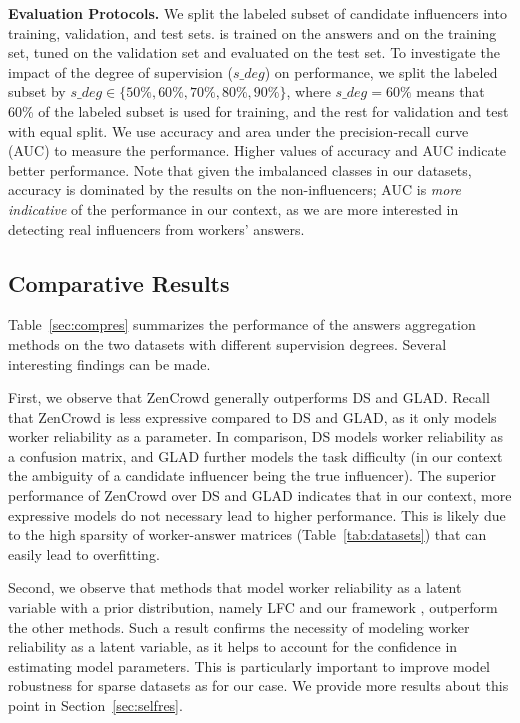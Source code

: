 \smallskip
\noindent\textbf{Evaluation Protocols.} We split the labeled subset of candidate influencers into training, validation, and test sets. \sys is trained on the answers and on the training set, tuned on the validation set and evaluated on the test set. To investigate the impact of the degree of supervision ($s\_deg$) on \sys performance, we split the labeled subset by $s\_deg\in \{50\%, 60\%, 70\%, 80\%, 90\%\}$, where $s\_deg = 60\%$ means that 60\% of the labeled subset is used for training, and the rest for validation and test with equal split. We use accuracy and area under the precision-recall curve (AUC) to measure the performance. Higher values of accuracy and AUC indicate better performance. Note that given the imbalanced classes in our datasets, accuracy is dominated by the results on the non-influencers; AUC is \emph{more indicative} of the performance in our context, as we are more interested in detecting real influencers from workers' answers. 



\subsection{Comparative Results}
Table~\ref{sec:compres} summarizes the performance of the answers aggregation methods on the two datasets with different supervision degrees. Several interesting findings can be made.

First, we observe that ZenCrowd generally outperforms DS and GLAD. Recall that ZenCrowd is less expressive compared to DS and GLAD, as it only models worker reliability as a parameter. In comparison, DS models worker reliability as a confusion matrix, and GLAD further models the task difficulty (in our context the ambiguity of a candidate influencer being the true influencer). The superior performance of ZenCrowd  over DS and GLAD indicates that in our context, more expressive models do not necessary lead to higher performance. This is likely due to the high sparsity of worker-answer matrices (Table~\ref{tab:datasets}) that can easily lead to overfitting.

Second, we observe that methods that model worker reliability as a latent variable with a prior distribution, namely LFC and our framework \sys, outperform the other methods. Such a result confirms the necessity of modeling worker reliability as a latent variable, as it helps to account for the confidence in estimating model parameters. This is particularly important to improve model robustness for sparse datasets as for our case. We provide more results about this point in Section~\ref{sec:selfres}.

